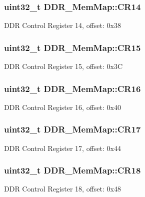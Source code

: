 \subsubsection[{C\+R14}]{\setlength{\rightskip}{0pt plus 5cm}uint32\+\_\+t D\+D\+R\+\_\+\+Mem\+Map\+::\+C\+R14}\label{struct_d_d_r___mem_map_a3018c26f66ee8dcd95b7d49e584ba52e}
D\+D\+R Control Register 14, offset\+: 0x38 \hypertarget{struct_d_d_r___mem_map_a9589578b2f90b8d144b73858bf8acda8}{}
\subsubsection[{C\+R15}]{\setlength{\rightskip}{0pt plus 5cm}uint32\+\_\+t D\+D\+R\+\_\+\+Mem\+Map\+::\+C\+R15}\label{struct_d_d_r___mem_map_a9589578b2f90b8d144b73858bf8acda8}
D\+D\+R Control Register 15, offset\+: 0x3\+C \hypertarget{struct_d_d_r___mem_map_a5a2679c2b98d9bc92c3d51cb2993637e}{}
\subsubsection[{C\+R16}]{\setlength{\rightskip}{0pt plus 5cm}uint32\+\_\+t D\+D\+R\+\_\+\+Mem\+Map\+::\+C\+R16}\label{struct_d_d_r___mem_map_a5a2679c2b98d9bc92c3d51cb2993637e}
D\+D\+R Control Register 16, offset\+: 0x40 \hypertarget{struct_d_d_r___mem_map_a35556f165ac9acbd999b24ddc4d97f0b}{}
\subsubsection[{C\+R17}]{\setlength{\rightskip}{0pt plus 5cm}uint32\+\_\+t D\+D\+R\+\_\+\+Mem\+Map\+::\+C\+R17}\label{struct_d_d_r___mem_map_a35556f165ac9acbd999b24ddc4d97f0b}
D\+D\+R Control Register 17, offset\+: 0x44 \hypertarget{struct_d_d_r___mem_map_abbaa85c7a05b85324b82badaf5ccdada}{}
\subsubsection[{C\+R18}]{\setlength{\rightskip}{0pt plus 5cm}uint32\+\_\+t D\+D\+R\+\_\+\+Mem\+Map\+::\+C\+R18}\label{struct_d_d_r___mem_map_abbaa85c7a05b85324b82badaf5ccdada}
D\+D\+R Control Register 18, offset\+: 0x48 \hypertarget{struct_d_d_r___mem_map_ae1ae024bcbfeb8890f2715de2be3e874}{}
